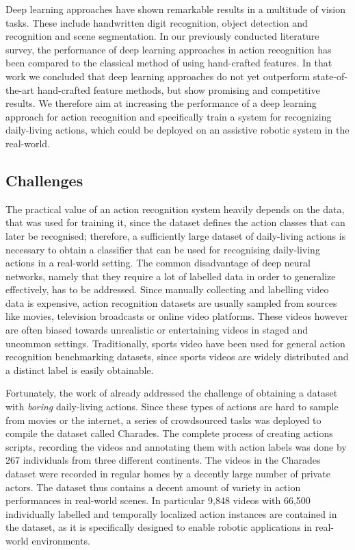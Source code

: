 Deep learning approaches have shown remarkable results in a multitude of vision tasks.
These include handwritten digit recognition\cite{lecun_handwritten_1990}, object detection and recognition\cite{redmon_you_2016}\cite{ren_faster_2015} and scene segmentation\cite{chen_deeplab:_2016}.
In our previously conducted literature survey\cite{schobel_evaluation_2017}, the performance of deep learning approaches in action recognition has been compared to the classical method of using hand-crafted features.
In that work we concluded that deep learning approaches do not yet outperform state-of-the-art hand-crafted feature methods, but show promising and competitive results.
We therefore aim at increasing the performance of a deep learning approach for action recognition and specifically train a system for recognizing daily-living actions, which could be deployed on an assistive robotic system in the real-world.

\subsection{Challenges}
The practical value of an action recognition system heavily depends on the data, that was used for training it, since the dataset defines the action classes that can later be recognised;
therefore, a sufficiently large dataset of daily-living actions is necessary to obtain a classifier that can be used for recognising daily-living actions in a real-world setting.
The common disadvantage of deep neural networks, namely that they require a lot of labelled data in order to generalize effectively, has to be addressed.
Since manually collecting and labelling video data is expensive, action recognition datasets are usually sampled from sources like movies, television broadcasts or online video platforms\cite{hassner_critical_2013}.
These videos however are often biased towards unrealistic or entertaining videos in staged and uncommon settings.
Traditionally, sports video have been used for general action recognition benchmarking datasets, since sports videos are widely distributed and a distinct label is easily obtainable.

Fortunately, the work of \textcite{sigurdsson_hollywood_2016} already addressed the challenge of obtaining a dataset with \textit{boring} daily-living actions.
Since these types of actions are hard to sample from movies or the internet, a series of crowdsourced tasks was deployed to compile the dataset called Charades\cite{sigurdsson_hollywood_2016}.
The complete process of creating actions scripts, recording the videos and annotating them with action labels was done by 267 individuals from three different continents.
The videos in the Charades dataset were recorded in regular homes by a decently large number of private actors.
The dataset thus contains a decent amount of variety in action performances in real-world scenes.
In particular 9,848 videos with 66,500 individually labelled and temporally localized action instances are contained in the dataset, as it is specifically designed to enable robotic applications in real-world environments.

